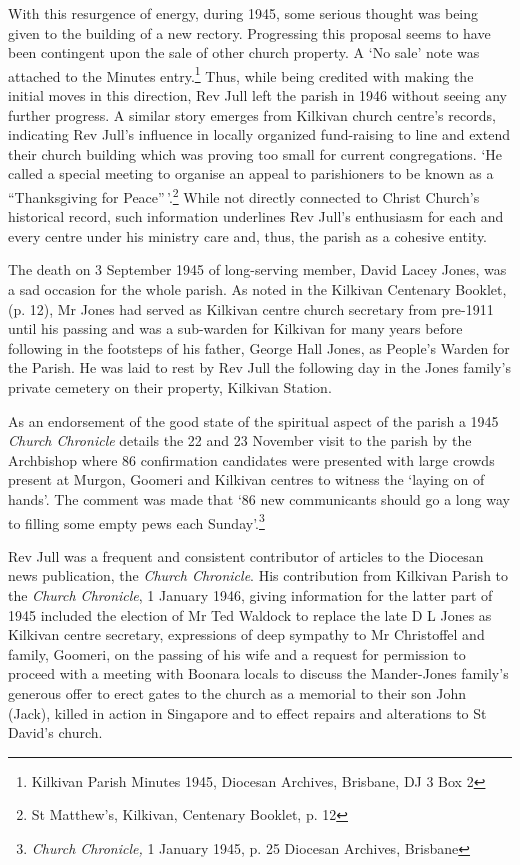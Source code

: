 With this resurgence of energy, during 1945, some serious thought was being given to the building of a new rectory. Progressing this proposal seems to have been contingent upon the sale of other church property. A `No sale' note was attached to the Minutes entry.\footnote{Kilkivan Parish Minutes 1945, Diocesan Archives, Brisbane, DJ 3 Box 2} Thus, while being credited with making the initial moves in this direction, Rev Jull left the parish in 1946 without seeing any further progress. A similar story emerges from Kilkivan church centre's records, indicating Rev Jull's influence in locally organized fund-raising to line and extend their church building which was proving too small for current congregations. `He called a special meeting to organise an appeal to parishioners to be known as a ``Thanksgiving for Peace''\,'.\footnote{St Matthew's, Kilkivan, Centenary Booklet, p. 12} While not directly connected to Christ Church's historical record, such information underlines Rev Jull's enthusiasm for each and every centre under his ministry care and, thus, the parish as a cohesive entity.


The death on 3 September 1945 of long-serving member, David Lacey Jones, was a sad occasion for the whole parish. As noted in the Kilkivan Centenary Booklet, (p. 12), Mr Jones had served as Kilkivan centre church secretary from pre-1911 until his passing and was a sub-warden for Kilkivan for many years before following in the footsteps of his father, George Hall Jones, as People's Warden for the Parish. He was laid to rest by Rev Jull the following day in the Jones family's private cemetery on their property, Kilkivan Station.



As an endorsement of the good state of the spiritual aspect of the parish a 1945 \emph{Church Chronicle} details the 22 and 23 November visit to the parish by the Archbishop where 86 confirmation candidates were presented with large crowds present at Murgon, Goomeri and Kilkivan centres to witness the `laying on of hands'. The comment was made that `86 new communicants should go a long way to filling some empty pews each Sunday'.\footnote{\emph{Church Chronicle,} 1 January 1945, p. 25 Diocesan Archives, Brisbane}


Rev Jull was a frequent and consistent contributor of articles to the Diocesan news publication, the \emph{Church Chronicle}. His contribution from Kilkivan Parish to the \emph{Church Chronicle}, 1 January 1946, giving information for the latter part of 1945 included the election of Mr Ted Waldock to replace the late D L Jones as Kilkivan centre secretary, expressions of deep sympathy to Mr Christoffel and family, Goomeri, on the passing of his wife and a request for permission to proceed with a meeting with Boonara locals to discuss the Mander-Jones family's generous offer to erect gates to the church as a memorial to their son John (Jack), killed in action in Singapore and to effect repairs and alterations to St David's church.



